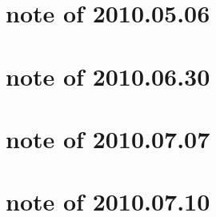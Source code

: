 \documentclass{article}
\begin{document}
\section{note of 2010.05.06}

\section{note of 2010.06.30}


\section{note of 2010.07.07}

\section{note of 2010.07.10}




\end{document}
